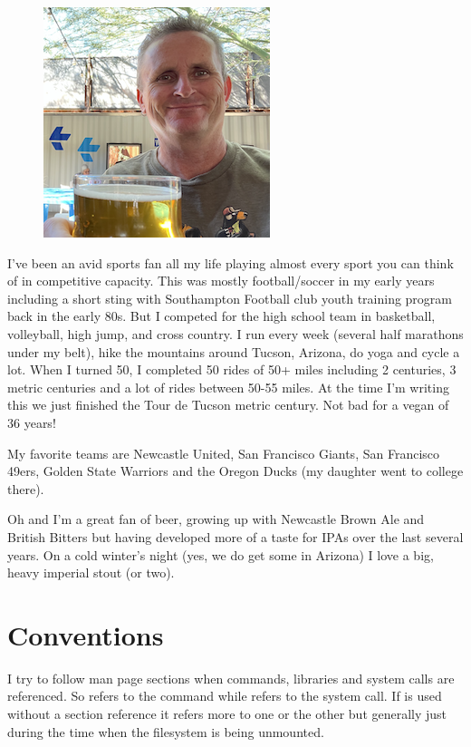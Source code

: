 \begin{figure}
	\centering
	\includegraphics[scale=0.8]{figures/beer.png}
\end{figure}

I've been an avid sports fan all my life playing almost every sport you can think of in competitive capacity. This was mostly football/soccer in my early years including a short sting with Southampton Football club youth training program back in the early 80s. But I competed for the high school team in basketball, volleyball, high jump, and cross country. I run every week (several half marathons under my belt), hike the mountains around Tucson, Arizona, do yoga and cycle a lot. When I turned 50, I completed 50 rides of 50+ miles including 2 centuries, 3 metric centuries and a lot of rides between 50-55 miles. At the time I'm writing this we just finished the Tour de Tucson metric century. Not bad for a vegan of 36 years!

\noindent
My favorite teams are Newcastle United, San Francisco Giants, San Francisco 49ers, Golden State Warriors and the Oregon Ducks (my daughter went to college there).

Oh and I'm a great fan of beer, growing up with Newcastle Brown Ale and British Bitters but having developed more of a taste for IPAs over the last several years. On a cold winter's night (yes, we do get some in Arizona) I love a big, heavy imperial stout (or two).


\section{Conventions}

I try to follow man page sections when commands, libraries and system calls are referenced. So  refers to the  command while  refers to the system call. If  is used without a section reference it refers more to one or the other but generally just during the time when the filesystem is being unmounted.

